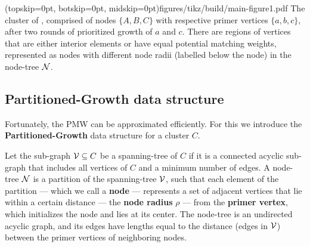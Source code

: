 \Figure[bt](topskip=0pt, botskip=0pt, midskip=0pt){figures/tikz/build/main-figure1.pdf}{
    The cluster of , comprised of nodes $\{A, B, C\}$ with respective primer vertices $\{a, b, c\}$, after two rounds of prioritized growth of $a$ and $c$. There are regions of vertices that are either interior elements or have equal potential matching weights, represented as nodes with different node radii (labelled below the node) in the node-tree $\mathcal{N}$. \label{fig:pmw}}

\subsection{Partitioned-Growth data structure}\label{sec:nodeset}
Fortunately, the PMW can be approximated efficiently. For this we introduce the \textbf{Partitioned-Growth} data structure for a cluster $C$.

Let the sub-graph $\mathcal{V}\subseteq C$ be a spanning-tree of $C$ if it is a connected acyclic sub-graph that includes all vertices of $C$ and a minimum number of edges. A node-tree $\mathcal{N}$ is a partition of the spanning-tree $\mathcal{V}$, such that each element of the partition --- which we call a \textbf{node} --- represents a set of adjacent vertices that lie within a certain distance --- the \textbf{node radius} $\rho$ --- from the \textbf{primer vertex}, which initializes the node and lies at its center. The node-tree is an undirected acyclic graph, and its edges have lengths equal to the distance (edges in $\mathcal{V}$) between the primer vertices of neighboring nodes. 





